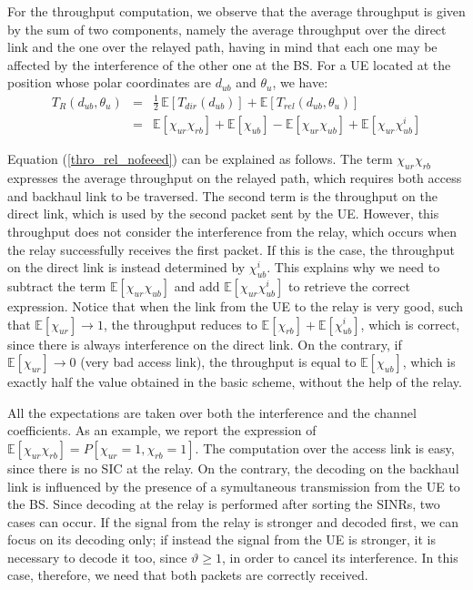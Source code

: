 \documentclass[12pt, letterpaper, onecolumn, draftcls]{IEEEtran}
\begin{document}
For the throughput computation, we observe that the average throughput is given by the sum of two components, namely the average throughput over the direct link and the one over the relayed path, having in mind that each one may be affected by the interference of the other one at the BS. For a UE located at the position whose polar coordinates are $d_{ub}$ and $\theta_u$, we have:
\begin{eqnarray}
 T_R(d_{ub},\theta_u) & = & \frac{1}{2}\,\mathbb{E}[T_{dir}(d_{ub})] + \mathbb{E}[T_{rel}(d_{ub},\theta_u)] \nonumber\\
 & = & \mathbb{E}\left[\chi_{ur}\chi_{rb}\right] + \mathbb{E}\left[\chi_{ub}\right] - \mathbb{E}\left[\chi_{ur}\chi_{ub}\right] + \mathbb{E}\left[\chi_{ur}\chi_{ub}^i\right]
\label{thro_rel_nofeeed}
\end{eqnarray}

Equation (\ref{thro_rel_nofeeed}) can be explained as follows. The term $\chi_{ur}\chi_{rb}$ expresses the average throughput on the relayed path, which requires both access and backhaul link to be traversed. The second term is the throughput on the direct link, which is used by the second packet sent by the UE. However, this throughput does not consider the interference from the relay, which occurs when the relay successfully receives the first packet.
If this is the case, the throughput on the direct link is instead determined by $\chi_{ub}^i$. This explains why we need to subtract the term $\mathbb{E}\left[\chi_{ur}\chi_{ub}\right]$ and add $\mathbb{E}\left[\chi_{ur}\chi_{ub}^i\right]$ to retrieve the correct expression.
Notice that when the link from the UE to the relay is very good, such that $\mathbb{E}\left[\chi_{ur}\right]\rightarrow 1$, the throughput reduces to $\mathbb{E}\left[\chi_{rb}\right] + \mathbb{E}\left[\chi_{ub}^i\right]$, which is correct, since there is always interference on the direct link. On the contrary, if $\mathbb{E}\left[\chi_{ur}\right]\rightarrow 0$ (very bad access link), the throughput is equal to $\mathbb{E}\left[\chi_{ub}\right]$, which is exactly half the value obtained in the basic scheme, without the help of the relay.

All the expectations are taken over both the interference and the channel coefficients. As an example, we report the expression of $\mathbb{E}\left[\chi_{ur}\chi_{rb}\right] = P[\chi_{ur}=1,\chi_{rb}=1]$. The computation over the access link is easy, since there is no SIC at the relay. On the contrary, the decoding on the backhaul link is influenced by the presence of a symultaneous transmission from the UE to the BS.
Since decoding at the relay is performed after sorting the SINRs, two cases can occur. If the signal from the relay is stronger and decoded first, we can focus on its decoding only; if instead the signal from the UE is stronger, it is necessary to decode it too, since $\vartheta\geq1$, in order to cancel its interference. In this case, therefore, we need that both packets are correctly received.
\end{document}
